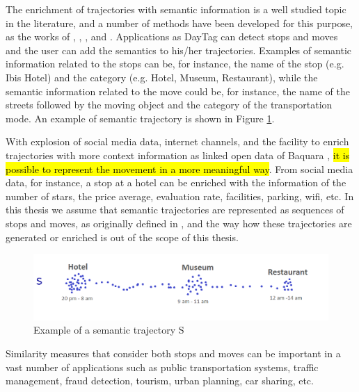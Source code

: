 The enrichment of trajectories with semantic information is a well studied topic in the literature, and a number of methods have been developed for this purpose, as the works of \cite{alvares2007model}, \cite{Palma2008}, \cite{manso}, and \cite{fileto2013baquara}. Applications as DayTag \cite{fernando2013} can detect stops and moves and the user can add the semantics to his/her trajectories. Examples of semantic information related to the stops can be, for instance, the name of the stop (e.g. Ibis Hotel) and the category (e.g. Hotel, Museum, Restaurant), while the semantic information related to the move could be, for instance, the name of the streets followed by the moving object and the category of the transportation mode. An example of semantic trajectory is shown in Figure \ref{fig:example_semantic_trajectory}.

With explosion of social media data, internet channels, and the facility to enrich trajectories with more context information as linked open data of Baquara \cite{fileto2013baquara}, \hl{it is possible to represent the movement in a more meaningful way}. From social media data, for instance, a stop at a hotel can be enriched with the information of the number of stars, the price average, evaluation rate, facilities, parking, wifi, etc.  In this thesis we assume that semantic trajectories are represented as sequences of stops and moves, as originally defined in \cite{Spaccapietra:2008:CVT:1347466.1347785}, and the way how these trajectories are generated or enriched is out of the scope of this thesis.

\begin{figure}[ht]
\centering
\includegraphics[width=1.0\textwidth]{Images/example_semantic-trajectory.png}
\caption{Example of a semantic trajectory S}
\label{fig:example_semantic_trajectory}
\end{figure}

Similarity measures that consider both stops and moves can be important in a vast number of applications such as public transportation systems, traffic management, fraud detection, tourism, urban planning, car sharing, etc.


